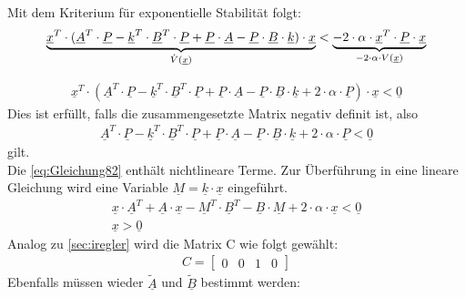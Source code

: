 \clearpage

Mit dem Kriterium für exponentielle Stabilität folgt:
\[
    \underbrace{%
        \underline{x}^T\cdot(\underline{A}^T\cdot\underline{P}-\underline{k}^T\cdot\underline{B}^T\cdot\underline{P}+\underline{P}\cdot\underline{A}-\underline{P}\cdot\underline{B}\cdot\underline{k})\cdot\underline{x}
    }_{%
    \dot{V}(\underline{x})
    }
    < 
    \underbrace{%
    -2\cdot\alpha \cdot \underline{x}^T\cdot\underline{P}\cdot\underline{x}
    }_{%
    -2\cdot\alpha\cdot V(\underline{x})
    }
\]

\begin{align} \label{eq:Gleichung82}
     \underline{x}^T\cdot(\underline{A}^T\cdot\underline{P}-\underline{k}^T\cdot\underline{B}^T\cdot\underline{P}+\underline{P}\cdot\underline{A}-\underline{P}\cdot\underline{B}\cdot\underline{k}+2\cdot\alpha\cdot\underline{P})\cdot\underline{x} < \underline{0}
\end{align}
\newline
Dies ist erfüllt, falls die zusammengesetzte Matrix negativ definit ist, also 
\begin{align*}
     \underline{A}^T\cdot\underline{P}-\underline{k}^T\cdot\underline{B}^T\cdot\underline{P}+\underline{P}\cdot\underline{A}-\underline{P}\cdot\underline{B}\cdot\underline{k}+2\cdot\alpha\cdot\underline{P} < \underline{0}
\end{align*}
\newline
gilt.\\
\newline
Die \autoref{eq:Gleichung82} enthält nichtlineare Terme. Zur Überführung in eine lineare Gleichung wird eine Variable $\underline{M}=\underline{k}\cdot\underline{x}$ eingeführt.
\begin{align} \label{eq:Gleichung83}
    \underline{x}\cdot\underline{A}^T+\underline{A}\cdot\underline{x}-\underline{M}^T\cdot\underline{B}^T-\underline{B}\cdot\underline{M}+2\cdot\alpha\cdot\underline{x} < \underline{0} \\
    \underline{x} > \underline{0} \nonumber
\end{align}
\newline
Analog zu \autoref{sec:iregler} wird die Matrix C wie folgt gewählt:
\begin{align*}
    C = 
    \begin{bmatrix}
        0 & 0 & 1 & 0
    \end{bmatrix}
\end{align*}
\newline
Ebenfalls müssen wieder $\underline{\tilde{A}}$ und $\underline{\tilde{B}}$ bestimmt werden:

